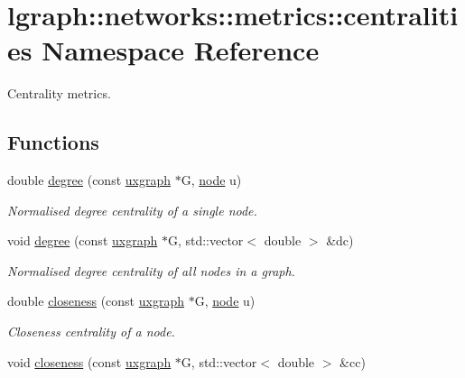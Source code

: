 \hypertarget{namespacelgraph_1_1networks_1_1metrics_1_1centralities}{}\section{lgraph\+:\+:networks\+:\+:metrics\+:\+:centralities Namespace Reference}
\label{namespacelgraph_1_1networks_1_1metrics_1_1centralities}


Centrality metrics.  


\subsection*{Functions}
\begin{DoxyCompactItemize}
\item 
double \hyperlink{namespacelgraph_1_1networks_1_1metrics_1_1centralities_a059db418660d28d673a154ceef293469}{degree} (const \hyperlink{classlgraph_1_1uxgraph}{uxgraph} $\ast$G, \hyperlink{namespacelgraph_a397169dd66adf725210a30fb7251773e}{node} u)
\begin{DoxyCompactList}\small\item\em Normalised degree centrality of a single node. \end{DoxyCompactList}\item 
void \hyperlink{namespacelgraph_1_1networks_1_1metrics_1_1centralities_a371fb57a5a7b42017baa3ef52a9e28a6}{degree} (const \hyperlink{classlgraph_1_1uxgraph}{uxgraph} $\ast$G, std\+::vector$<$ double $>$ \&dc)
\begin{DoxyCompactList}\small\item\em Normalised degree centrality of all nodes in a graph. \end{DoxyCompactList}\item 
double \hyperlink{namespacelgraph_1_1networks_1_1metrics_1_1centralities_a5e567539ccb6396bfb47ba2173a0cc4c}{closeness} (const \hyperlink{classlgraph_1_1uxgraph}{uxgraph} $\ast$G, \hyperlink{namespacelgraph_a397169dd66adf725210a30fb7251773e}{node} u)
\begin{DoxyCompactList}\small\item\em Closeness centrality of a node. \end{DoxyCompactList}\item 
void \hyperlink{namespacelgraph_1_1networks_1_1metrics_1_1centralities_aa7252de7745ee93430ddef0b64643077}{closeness} (const \hyperlink{classlgraph_1_1uxgraph}{uxgraph} $\ast$G, std\+::vector$<$ double $>$ \&cc)

\end{DoxyCompactItemize}
